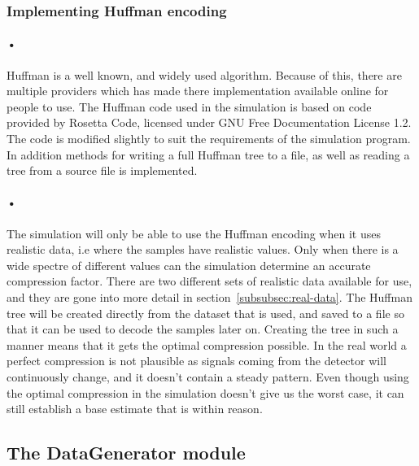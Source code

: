 \documentclass[a4paper, 12pt]{report}
\begin{document}
\begin{minipage}{\linewidth}

\end{minipage}

\subsubsection{Implementing Huffman encoding}

\paragraph{•}
Huffman is a well known, and widely used algorithm.
Because of this, there are multiple providers which has made there implementation available online for people to use.
The Huffman code used in the simulation is based on code provided by Rosetta Code, licensed under GNU Free Documentation License 1.2\cite{rosetta}\cite{gnu}.
The code is modified slightly to suit the requirements of the simulation program.
In addition methods for writing a full Huffman tree to a file, as well as reading a tree from a source file is implemented.

\paragraph{•}
The simulation will only be able to use the Huffman encoding when it uses realistic data, i.e where the samples have realistic values.
Only when there is a wide spectre of different values can the simulation determine an accurate compression factor.
There are two different sets of realistic data available for use, and they are gone into more detail in section~\ref{subsubsec:real-data}.
The Huffman tree will be created directly from the dataset that is used, and saved to a file so that it can be used to decode the samples later on.
Creating the tree in such a manner means that it gets the optimal compression possible.
In the real world a perfect compression is not plausible as signals coming from the detector will continuously change, and it doesn't contain a steady pattern.
Even though using the optimal compression in the simulation doesn't give us the worst case, it can still establish a base estimate that is within reason.

\subsection{The DataGenerator module}
\end{document}
